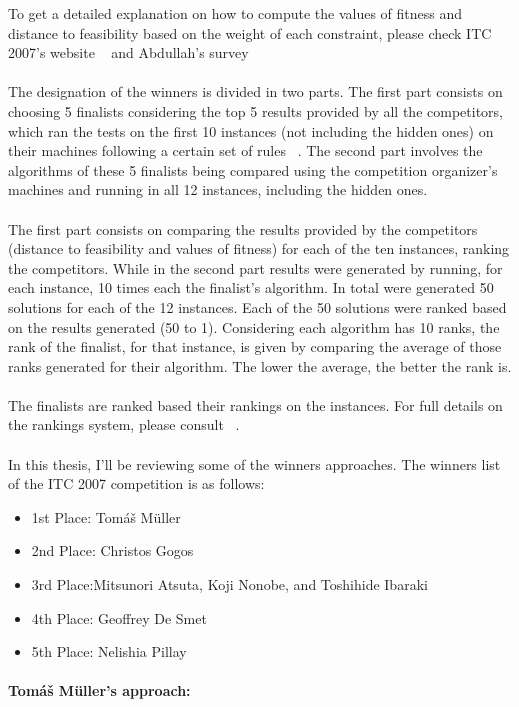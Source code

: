 To get a detailed explanation on how to compute the values of fitness and distance to feasibility based on the weight of each constraint, please check ITC 2007's website ~\cite{McCollum2008} and Abdullah's survey ~\cite{Abdullah2013}\\
\\
The designation of the winners is divided in two parts. The first part consists on choosing 5 finalists considering the top 5 results provided by all the competitors, which ran the tests on the first 10 instances (not including the hidden ones) on their machines following a certain set of rules ~\cite{BarryMcCollum2008}. The second part involves the algorithms of these 5 finalists being compared using the competition organizer's machines and running in all 12 instances, including the hidden ones.\\
\\
The first part consists on comparing the results provided by the competitors (distance to feasibility and values of fitness) for each of the ten instances, ranking the competitors. While in the second part results were generated by running, for each instance, 10 times each the finalist's algorithm. In total were generated 50 solutions for each of the 12 instances. Each of the 50 solutions were ranked based on the results generated (50 to 1). Considering each algorithm has 10 ranks, the rank of the finalist, for that instance, is given by comparing the average of those ranks generated for their algorithm. The lower the average, the better the rank is.\\
\\
The finalists are ranked based their rankings on the instances. For full details on the rankings system, please consult ~\cite{BarryMcCollum2008}.\\
\\
In this thesis, I'll be reviewing some of the winners approaches. The winners list of the ITC 2007 competition is as follows:
\begin{itemize}
	\item 1st Place: Tom\'{a}\v{s} M\"{u}ller
	\item 2nd Place: Christos Gogos
	\item 3rd Place:Mitsunori Atsuta, Koji Nonobe, and Toshihide Ibaraki
	\item 4th Place: Geoffrey De Smet
	\item 5th Place: Nelishia Pillay
\end{itemize}

\paragraph{Tom\'{a}\v{s} M\"{u}ller's approach:}

